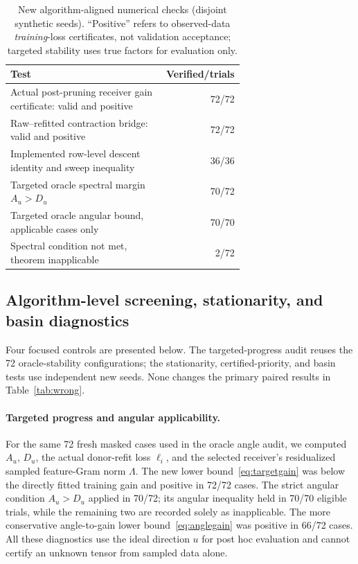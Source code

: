 \documentclass[review,10pt]{elsarticle}
\begin{document}
\begin{table}[tbp]
\caption{New algorithm-aligned numerical checks (disjoint synthetic seeds). ``Positive'' refers to observed-data \emph{training}-loss certificates, not validation acceptance; targeted stability uses true factors for evaluation only.}\label{tab:review4audit}
\centering\small
\begin{tabular}{p{0.67\linewidth}r}
\toprule
Test & Verified/trials\\
\midrule
Actual post-pruning receiver gain certificate: valid and positive & 72/72\\
Raw--refitted contraction bridge: valid and positive & 72/72\\
Implemented row-level descent identity and sweep inequality & 36/36\\
Targeted oracle spectral margin $A_u>D_u$ & 70/72\\
Targeted oracle angular bound, applicable cases only & 70/70\\
Spectral condition not met, theorem inapplicable & 2/72\\
\bottomrule
\end{tabular}
\end{table}
\subsection{Algorithm-level screening, stationarity, and basin diagnostics}\label{subsec:review5}
Four focused controls are presented below. The targeted-progress audit reuses the 72 oracle-stability configurations; the stationarity, certified-priority, and basin tests use independent new seeds. None changes the primary paired results in Table~\ref{tab:wrong}.

\paragraph{Targeted progress and angular applicability.}
For the same 72 fresh masked cases used in the oracle angle audit, we computed $A_u$, $D_u$, the actual donor-refit loss $\ell_i$, and the selected receiver's residualized sampled feature-Gram norm $\Lambda$. The new lower bound~\eqref{eq:targetgain} was below the directly fitted training gain and positive in 72/72 cases. The strict angular condition $A_u>D_u$ applied in 70/72; its angular inequality held in 70/70 eligible trials, while the remaining two are recorded solely as inapplicable. The more conservative angle-to-gain lower bound~\eqref{eq:anglegain} was positive in 66/72 cases. All these diagnostics use the ideal direction $u$ for post hoc evaluation and cannot certify an unknown tensor from sampled data alone.
\end{document}

